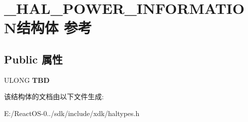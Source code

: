 \hypertarget{struct___h_a_l___p_o_w_e_r___i_n_f_o_r_m_a_t_i_o_n}{}\section{\+\_\+\+H\+A\+L\+\_\+\+P\+O\+W\+E\+R\+\_\+\+I\+N\+F\+O\+R\+M\+A\+T\+I\+O\+N结构体 参考}
\label{struct___h_a_l___p_o_w_e_r___i_n_f_o_r_m_a_t_i_o_n}
\subsection*{Public 属性}
\begin{DoxyCompactItemize}
\item 
\mbox{\label{struct___h_a_l___p_o_w_e_r___i_n_f_o_r_m_a_t_i_o_n_aba16a2f9fedb02405b83b689ab0e95f3}} 
U\+L\+O\+NG {\bfseries T\+BD}
\end{DoxyCompactItemize}


该结构体的文档由以下文件生成\+:\begin{DoxyCompactItemize}
\item 
E\+:/\+React\+O\+S-\/0../sdk/include/xdk/haltypes.\+h\end{DoxyCompactItemize}
